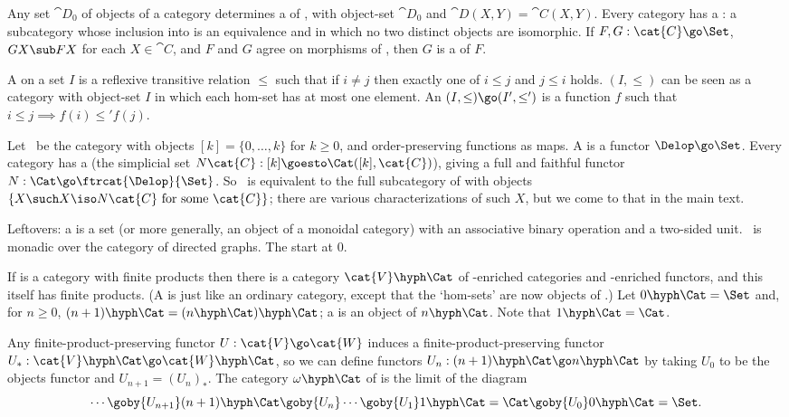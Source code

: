 Any set $\cat{D}_0$ of objects of a category  determines a   of , with object-set $\cat{D}_0$ and
$\cat{D}(X,Y) = \cat{C}(X,Y)$.  Every category  has a
: a subcategory whose inclusion into  is an
equivalence and in which no two distinct objects are isomorphic.  If $F, G:
\cat{C} \go \Set$, $GX \sub FX$ for each $X \in \cat{C}$, and $F$ and $G$
agree on morphisms of , then $G$ is a
 of $F$.

A  on a set $I$ is a reflexive transitive
relation $\leq$ such that if $i \neq j$ then exactly one of $i\leq j$ and
$j\leq i$ holds.  
$(I,\leq)$ can be seen as a category with object-set $I$
in which each hom-set has at most one element.
An  $(I,\leq) \go (I',\leq')$
is a function $f$ such that $i \leq j \implies f(i) \leq' f(j)$.

Let \Del\ be the category with objects $[k]=\{0,\ldots,k\}$ for $k\geq 0$,
and order-preserving functions as maps.  A  is a
functor $\Delop \go \Set$.  Every category  has a  (the
simplicial set $N\cat{C}: [k] \goesto \Cat([k],\cat{C})$), giving a full and
faithful functor $N: \Cat \go \ftrcat{\Delop}{\Set}$.  So \Cat\ is equivalent
to the full subcategory of \ftrcat{\Delop}{\Set} with objects $\{ X \such X
\iso N\cat{C} \textrm{ for some } \cat{C} \}$; there are various
characterizations of such $X$, but we come to that in the main text.

Leftovers: a  is a set (or more generally, an object of a
monoidal category) with an associative binary operation and a two-sided unit.
\Cat\ is monadic over the category of directed graphs.  The  start at $0$.


\clearpage





If  is a category with finite products then there is a category
$\cat{V}\hyph\Cat$ of -enriched categories and -enriched
functors, and this itself has finite products.  (A  is just like an ordinary category, except that the `hom-sets' are
now objects of .)  Let $0\hyph\Cat = \Set$ and, for $n\geq 0$,
$(n+1)\hyph\Cat = (n\hyph\Cat)\hyph\Cat$; a  is an
object of $n\hyph\Cat$.  Note that $1\hyph\Cat = \Cat$.

Any finite-product-preserving functor $U: \cat{V} \go \cat{W}$
induces a finite-product-preserving functor $U_*: \cat{V}\hyph\Cat \go
\cat{W}\hyph\Cat$, so we can define functors $U_n: (n+1)\hyph\Cat \go
n\hyph\Cat$ by taking $U_0$ to be the objects functor and $U_{n+1} =
(U_n)_*$.  The category $\omega\hyph\Cat$ of  is the limit of the diagram
\[
\cdots 
\goby{U_{n+1}} (n+1)\hyph\Cat  \goby{U_n} 
\cdots
\goby{U_1} 1\hyph\Cat = \Cat
\goby{U_0} 0\hyph\Cat = \Set.
\]

